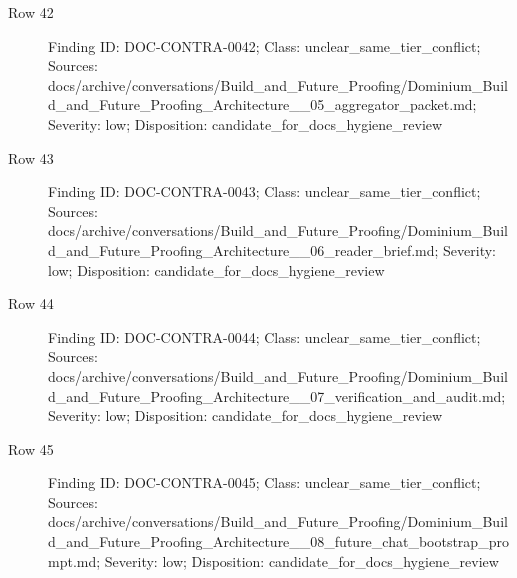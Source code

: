 \documentclass[9pt,a4paper]{book}
\begin{document}
\begin{description}
\item[Row 42] Finding ID: DOC-\allowbreak{}CONTRA-\allowbreak{}0042; Class: unclear\_\allowbreak{}same\_\allowbreak{}tier\_\allowbreak{}conflict; Sources: docs/\allowbreak{}archive/\allowbreak{}conversations/\allowbreak{}Build\_\allowbreak{}and\_\allowbreak{}Future\_\allowbreak{}Proofing/\allowbreak{}Dominium\_\allowbreak{}Build\_\allowbreak{}and\_\allowbreak{}Future\_\allowbreak{}Proofing\_\allowbreak{}Architecture\_\allowbreak{}\_\allowbreak{}05\_\allowbreak{}aggregator\_\allowbreak{}packet.\allowbreak{}md; Severity: low; Disposition: candidate\_\allowbreak{}for\_\allowbreak{}docs\_\allowbreak{}hygiene\_\allowbreak{}review
\item[Row 43] Finding ID: DOC-\allowbreak{}CONTRA-\allowbreak{}0043; Class: unclear\_\allowbreak{}same\_\allowbreak{}tier\_\allowbreak{}conflict; Sources: docs/\allowbreak{}archive/\allowbreak{}conversations/\allowbreak{}Build\_\allowbreak{}and\_\allowbreak{}Future\_\allowbreak{}Proofing/\allowbreak{}Dominium\_\allowbreak{}Build\_\allowbreak{}and\_\allowbreak{}Future\_\allowbreak{}Proofing\_\allowbreak{}Architecture\_\allowbreak{}\_\allowbreak{}06\_\allowbreak{}reader\_\allowbreak{}brief.\allowbreak{}md; Severity: low; Disposition: candidate\_\allowbreak{}for\_\allowbreak{}docs\_\allowbreak{}hygiene\_\allowbreak{}review
\item[Row 44] Finding ID: DOC-\allowbreak{}CONTRA-\allowbreak{}0044; Class: unclear\_\allowbreak{}same\_\allowbreak{}tier\_\allowbreak{}conflict; Sources: docs/\allowbreak{}archive/\allowbreak{}conversations/\allowbreak{}Build\_\allowbreak{}and\_\allowbreak{}Future\_\allowbreak{}Proofing/\allowbreak{}Dominium\_\allowbreak{}Build\_\allowbreak{}and\_\allowbreak{}Future\_\allowbreak{}Proofing\_\allowbreak{}Architecture\_\allowbreak{}\_\allowbreak{}07\_\allowbreak{}verification\_\allowbreak{}and\_\allowbreak{}audit.\allowbreak{}md; Severity: low; Disposition: candidate\_\allowbreak{}for\_\allowbreak{}docs\_\allowbreak{}hygiene\_\allowbreak{}review
\item[Row 45] Finding ID: DOC-\allowbreak{}CONTRA-\allowbreak{}0045; Class: unclear\_\allowbreak{}same\_\allowbreak{}tier\_\allowbreak{}conflict; Sources: docs/\allowbreak{}archive/\allowbreak{}conversations/\allowbreak{}Build\_\allowbreak{}and\_\allowbreak{}Future\_\allowbreak{}Proofing/\allowbreak{}Dominium\_\allowbreak{}Build\_\allowbreak{}and\_\allowbreak{}Future\_\allowbreak{}Proofing\_\allowbreak{}Architecture\_\allowbreak{}\_\allowbreak{}08\_\allowbreak{}future\_\allowbreak{}chat\_\allowbreak{}bootstrap\_\allowbreak{}prompt.\allowbreak{}md; Severity: low; Disposition: candidate\_\allowbreak{}for\_\allowbreak{}docs\_\allowbreak{}hygiene\_\allowbreak{}review

\end{description}
\end{document}
